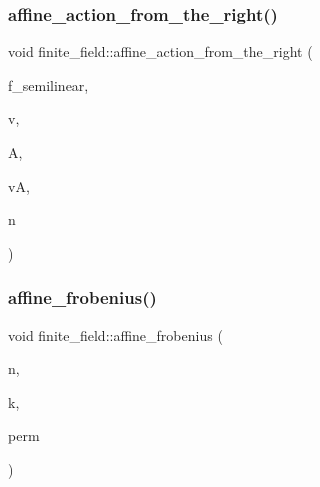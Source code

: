 \mbox{\label{classfinite__field_ae3de2a55577f65d79eaba0b322e3b452}} 
\subsubsection{\texorpdfstring{affine\+\_\+action\+\_\+from\+\_\+the\+\_\+right()}{affine\_action\_from\_the\_right()}}
{\footnotesize\ttfamily void finite\+\_\+field\+::affine\+\_\+action\+\_\+from\+\_\+the\+\_\+right (\begin{DoxyParamCaption}\item[{\mbox{\hyperlink{galois_8h_a09fddde158a3a20bd2dcadb609de11dc}{I\+NT}}}]{f\+\_\+semilinear,  }\item[{\mbox{\hyperlink{galois_8h_a09fddde158a3a20bd2dcadb609de11dc}{I\+NT}} $\ast$}]{v,  }\item[{\mbox{\hyperlink{galois_8h_a09fddde158a3a20bd2dcadb609de11dc}{I\+NT}} $\ast$}]{A,  }\item[{\mbox{\hyperlink{galois_8h_a09fddde158a3a20bd2dcadb609de11dc}{I\+NT}} $\ast$}]{vA,  }\item[{\mbox{\hyperlink{galois_8h_a09fddde158a3a20bd2dcadb609de11dc}{I\+NT}}}]{n }\end{DoxyParamCaption})}

\mbox{\label{classfinite__field_a432f4d0e725573d58bb823cf76772d05}} 
\subsubsection{\texorpdfstring{affine\+\_\+frobenius()}{affine\_frobenius()}}
{\footnotesize\ttfamily void finite\+\_\+field\+::affine\+\_\+frobenius (\begin{DoxyParamCaption}\item[{\mbox{\hyperlink{galois_8h_a09fddde158a3a20bd2dcadb609de11dc}{I\+NT}}}]{n,  }\item[{\mbox{\hyperlink{galois_8h_a09fddde158a3a20bd2dcadb609de11dc}{I\+NT}}}]{k,  }\item[{\mbox{\hyperlink{galois_8h_a09fddde158a3a20bd2dcadb609de11dc}{I\+NT}} $\ast$}]{perm }\end{DoxyParamCaption})}

